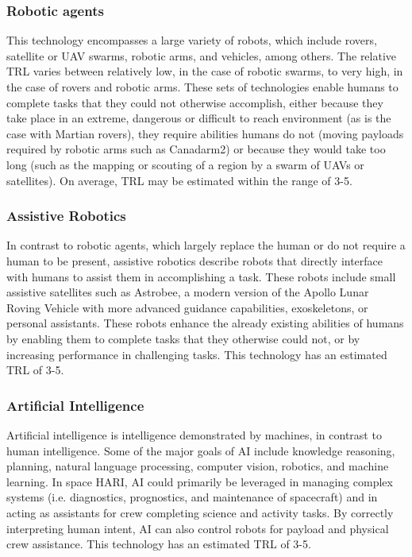 \subsubsection{Robotic agents}
This technology encompasses a large variety of robots, which include rovers, satellite or UAV swarms, robotic arms, and vehicles, among others.
The relative TRL varies between relatively low, in the case of robotic swarms, to very high, in the case of rovers and robotic arms.
These sets of technologies enable humans to complete tasks that they could not otherwise accomplish, either because they take place in an extreme, dangerous or difficult to reach environment (as is the case with Martian rovers), they require abilities humans do not (moving payloads required by robotic arms such as Canadarm2) or because they would take too long (such as the mapping or scouting of a region by a swarm of UAVs or satellites).
On average, TRL may be estimated within the range of 3-5.

\subsubsection{Assistive Robotics}
In contrast to robotic agents, which largely replace the human or do not require a human to be present, assistive robotics describe robots that directly interface with humans to assist them in accomplishing a task.
These robots include small assistive satellites such as Astrobee, a modern version of the Apollo Lunar Roving Vehicle with more advanced guidance capabilities, exoskeletons, or personal assistants.
These robots enhance the already existing abilities of humans by enabling them to complete tasks that they otherwise could not, or by increasing performance in challenging tasks.
This technology has an estimated TRL of 3-5.

\subsubsection{Artificial Intelligence}
Artificial intelligence is intelligence demonstrated by machines, in contrast to human intelligence.
Some of the major goals of AI include knowledge reasoning, planning, natural language processing, computer vision, robotics, and machine learning.
In space HARI, AI could primarily be leveraged in managing complex systems (i.e. diagnostics, prognostics, and maintenance of spacecraft) and in acting as assistants for crew completing science and activity tasks.
By correctly interpreting human intent, AI can also control robots for payload and physical crew assistance.
This technology has an estimated TRL of 3-5.

